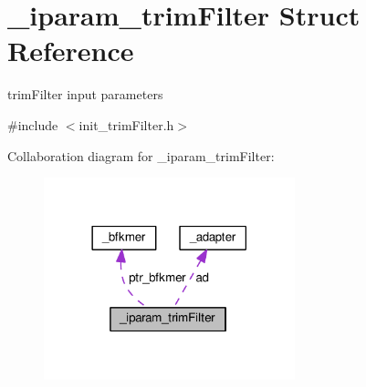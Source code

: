 \hypertarget{struct__iparam__trimFilter}{\section{\+\_\+iparam\+\_\+trim\+Filter Struct Reference}
\label{struct__iparam__trimFilter}
}


trim\+Filter input parameters  




{\ttfamily \#include $<$init\+\_\+trim\+Filter.\+h$>$}



Collaboration diagram for \+\_\+iparam\+\_\+trim\+Filter\+:
\nopagebreak
\begin{figure}[H]
\begin{center}
\leavevmode
\includegraphics[width=206pt]{struct__iparam__trimFilter__coll__graph}
\end{center}
\end{figure}
